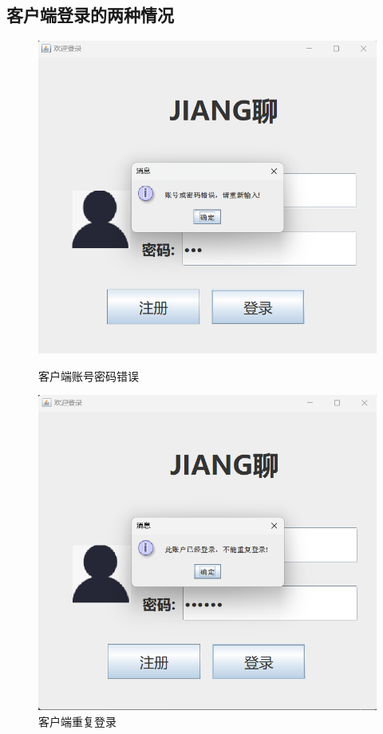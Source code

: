 \documentclass[UTF8,12pt]{article}
\begin{document}
\newpage

\subsection{客户端登录的两种情况}
\begin{figure}[htbp]
    \centering
    \begin{minipage}{0.4\textwidth}
        \centering
        \includegraphics[width=1.0\textwidth]{img/11.png}
        \caption{客户端账号密码错误}
    \end{minipage}
    \begin{minipage}{0.4\textwidth}
        \centering
        \includegraphics[width=1.0\textwidth]{img/12.png}
        \caption{客户端重复登录}
    \end{minipage}
\end{figure}
\end{document}
